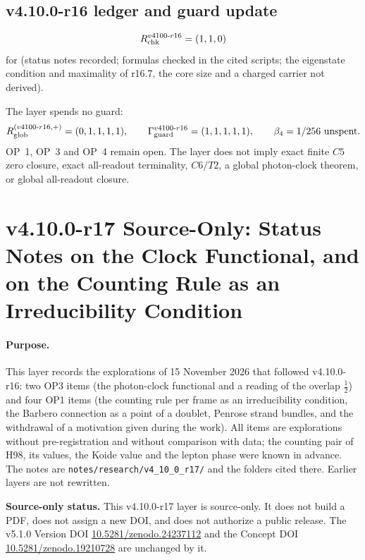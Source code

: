 \subsection*{v4.10.0-r16 ledger and guard update}
\label{subsec:v4100-r16-ledger-guard}

\[
R_{\rm chk}^{v4100\text{-}r16}=(1,1,0)
\]
for (status notes recorded; formulas checked in the cited scripts; the eigenstate condition and maximality of r16.7, the core
size and a charged carrier not derived).

The layer spends no guard:
\[
R_{\rm glob}^{(v4100\text{-}r16,+)}=(0,1,1,1,1),
\qquad
\Gamma_{\rm guard}^{v4100\text{-}r16}=(1,1,1,1,1),
\qquad
\beta_4=1/256\ \text{unspent}.
\]
OP~1, OP~3 and OP~4 remain open.  The layer does not imply exact finite \(C5\) zero closure, exact all-readout terminality,
\(C6/T2\), a global photon-clock theorem, or global all-readout closure.

\clearpage
\section*{v4.10.0-r17 Source-Only: Status Notes on the Clock Functional, and on the Counting Rule as an Irreducibility Condition}
\label{sec:v4100-r17-clock-irreducibility}

\paragraph{Purpose.}
This layer records the explorations of 15 November 2026 that followed v4.10.0-r16: two OP3 items (the photon-clock functional
and a reading of the overlap \(\tfrac12\)) and four OP1 items (the counting rule per frame as an irreducibility condition, the
Barbero connection as a point of a doublet, Penrose strand bundles, and the withdrawal of a motivation given during the
work).  All items are explorations without pre-registration and without comparison with data; the counting pair of H98, its
values, the Koide value and the lepton phase were known in advance.  The notes are
\texttt{notes/\allowbreak research/\allowbreak v4\_10\_0\_r17/} and the folders cited there.  Earlier layers are not
rewritten.

\noindent\textbf{Source-only status.}
This v4.10.0-r17 layer is source-only.  It does not build a PDF, does not assign a new DOI,
and does not authorize a public release.  The v5.1.0 Version DOI
\href{https://doi.org/10.5281/zenodo.24237112}{10.5281/zenodo.24237112} and the Concept DOI
\href{https://doi.org/10.5281/zenodo.19210728}{10.5281/zenodo.19210728} are unchanged by it.

